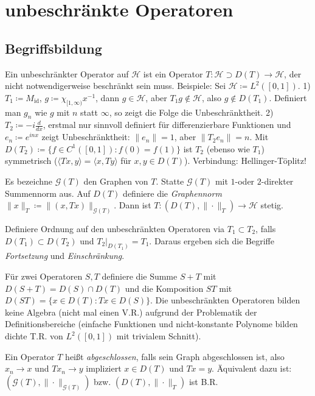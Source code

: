 \documentclass[11pt,a4paper]{scrartcl}
\newcommand{\Hc}{\mathcal{H}}
\newcommand{\G}{\mathcal{G}}
\theoremstyle{plain}
\theoremstyle{definition}
\theoremstyle{remark}
\DeclareMathOperator{\id}{id}
\begin{document}
\section{unbeschränkte Operatoren}

\subsection{Begriffsbildung}

Ein unbeschränkter Operator auf $\Hc$ ist ein Operator $T:\Hc \supset D(T) \to \Hc$, der nicht notwendigerweise beschränkt sein muss. Beispiele: Sei $\Hc\coloneqq L^2([0,1])$.  1) $T_1\coloneqq M_{\id}$, $g\coloneqq \chi_{[1,\infty)} x^{-1}$, dann $g\in \Hc$, aber $T_1g\not\in \Hc$, also $g\not\in D(T_1)$. Definiert man $g_n$ wie $g$ mit $n$ statt $\infty$, so zeigt die Folge die Unbeschränktheit.  2) $T_2\coloneqq -i \frac{d}{dx}$, erstmal nur sinnvoll definiert für differenzierbare Funktionen und $e_n\coloneqq e^{inx}$ zeigt Unbeschränktheit: $\|e_n\|=1$, aber $\|T_2 e_n\|=n$. Mit $D(T_2)\coloneqq \{f\in C^1([0,1]): f(0)=f(1) \}$ ist $T_2$ (ebenso wie $T_1$) symmetrisch ($\langle Tx,y\rangle = \langle x, Ty \rangle$ für $x,y\in D(T)$). Verbindung: Hellinger-Töplitz!

Es bezeichne $\G(T)$ den Graphen von $T$. Statte $\G(T)$ mit $1$-oder $2$-direkter Summennorm aus. Auf $D(T)$ definiere die \emph{Graphennorm} $\|x\|_T \coloneqq \|(x,Tx)\|_{\G(T)}$. Dann ist $T: (D(T), \|\cdot\|_T) \to \Hc$ stetig.

Definiere Ordnung auf den unbeschränkten Operatoren via $T_1 \subset T_2$, falls $D(T_1)\subset D(T_2)$ und $T_2|_{D(T_1)} = T_1$. Daraus ergeben sich die Begriffe \emph{Fortsetzung} und \emph{Einschränkung}.

Für zwei Operatoren $S,T$ definiere die Summe $S+T$ mit $D(S+T)=D(S)\cap D(T)$ und die Komposition $ST$ mit $D(ST)=\{x\in D(T): Tx\in D(S)\}$. Die unbeschränkten Operatoren bilden keine Algebra (nicht mal einen V.R.) aufgrund der Problematik der Definitionsbereiche (einfache Funktionen und nicht-konstante Polynome bilden dichte T.R. von $L^2([0,1])$ mit trivialem Schnitt).

Ein Operator $T$ heißt \emph{abgeschlossen}, falls sein Graph abgeschlossen ist, also $x_n\to x$ und $Tx_n\to y$ impliziert $x\in D(T)$ und $Tx=y$. Äquivalent dazu ist: $(\G(T),\|\cdot\|_{\G(T)})$ bzw. $(D(T), \|\cdot\|_T)$ ist B.R.
\end{document}

